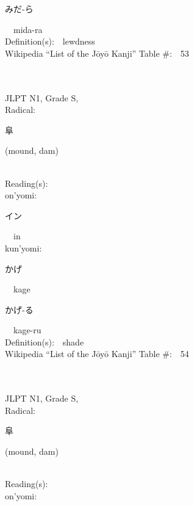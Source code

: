 \begin{multicols}{2}
{\hspace*{2em}}{\begin{CJK}{UTF8}{min} みだ-ら \end{CJK}}\ \ mida-ra\ \ \\
Definition(s):\ \ lewdness \\
Wikipedia ``List of the J\=oy\=o Kanji'' Table \#:\ \ 53 \\
\ \ \\
{\fontsize{34pt}{40pt}  }\ \ \\
{JLPT N1, Grade S, \\Radical:\ \ {\begin{CJK}{UTF8}{min} 阜 \end{CJK}} (mound, dam) } \\
Reading(s):\ \ \\
{\hspace*{1em}}on'yomi:\ \ \\
{\hspace*{2em}}{\begin{CJK}{UTF8}{min} イン \end{CJK}}\ \ in\ \ \\
{\hspace*{1em}}kun'yomi:\ \ \\
{\hspace*{2em}}{\begin{CJK}{UTF8}{min} かげ \end{CJK}}\ \ kage\ \ \\
{\hspace*{2em}}{\begin{CJK}{UTF8}{min} かげ-る \end{CJK}}\ \ kage-ru\ \ \\
Definition(s):\ \ shade \\
Wikipedia ``List of the J\=oy\=o Kanji'' Table \#:\ \ 54 \\
\ \ \\
{\fontsize{34pt}{40pt}  }\ \ \\
{JLPT N1, Grade S, \\Radical:\ \ {\begin{CJK}{UTF8}{min} 阜 \end{CJK}} (mound, dam) } \\
Reading(s):\ \ \\
{\hspace*{1em}}on'yomi:\ \ \\

\end{multicols}
